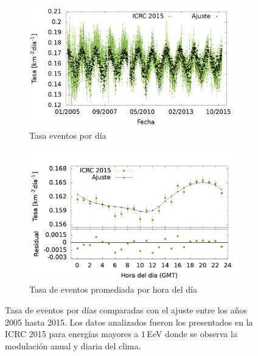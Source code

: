 			\begin{figure}[H]
				\begin{subfigure}[b]{0.5\textwidth}
				\includegraphics[width=\textwidth]{../clima/Graphs/rate_dayly/1EeV_ICRC_2015.png}
				\caption{Tasa eventos por día}\label{fig:rate_dayly_ICRC_2015}
    			\end{subfigure}%
    			\hspace{\fill}
    			\begin{subfigure}[b]{0.5\textwidth}
				\includegraphics[width=\textwidth]{../clima/Graphs/rate_hour_of_the_day/1EeV_ICRC_2015_old_herald.png}
				\caption{Tasa de eventos promediada por hora del día }\label{fig:rate_hod_ICRC_2015}
    			\end{subfigure}%
				\caption{Tasa de eventos por días comparadas con el ajuste entre los años 2005 hasta 2015. Los datos analizados fueron los presentados en la ICRC 2015 para energías mayores a $1\,$EeV donde se observa la modulación anual y diaria del clima. }\label{fig:rate_2015_05-15}
			\end{figure}



